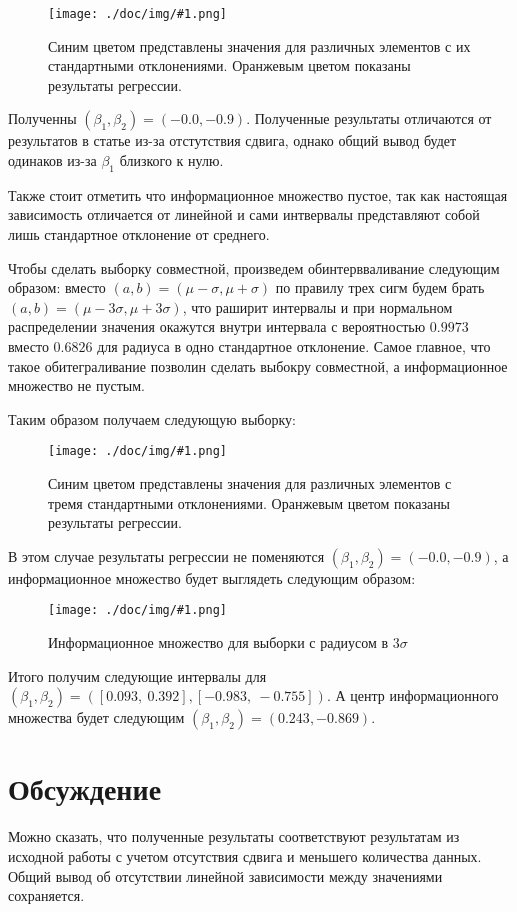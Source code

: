 \documentclass[a4paper,12pt]{article}
\newcommand{\plot}[3]{
    \begin{figure}[H]
        \begin{center}
            \texttt{[image: ./doc/img/\#1.png]}
            \caption{#2}
            \label{#3}
        \end{center}
    \end{figure}
}
\begin{document}
    \plot{Se Sr Y Nb Mo}{
        Синим цветом представлены значения для различных элементов с их стандартными отклонениями.
        Оранжевым цветом показаны результаты регрессии.
    }{linreg}

    
    Полученны $(\beta_1, \beta_2) = (-0.0, -0.9)$. Полученные результаты отличаются от результатов в статье из-за 
    отстутствия сдвига, однако общий вывод будет одинаков из-за $\beta_1$ близкого к нулю.

    Также стоит отметить что информационное множество пустое, так как настоящая зависимость отличается от линейной
    и сами интвервалы представляют собой лишь стандартное отклонение от среднего.

    Чтобы сделать выборку совместной, произведем обинтервваливание следующим образом:
    вместо $(a, b) = (\mu - \sigma, \mu + \sigma)$ по правилу трех сигм будем брать 
    $(a, b) = (\mu - 3\sigma, \mu + 3\sigma)$, что раширит интервалы и при нормальном распределении
    значения окажутся внутри интервала с вероятностью $0.9973$ вместо $0.6826$
    для радиуса в одно стандартное отклонение. Самое главное, что такое обитеграливание 
    позволин сделать выбокру совместной, а информационное множество не пустым.

    Таким образом получаем следующую выборку:

    \plot{Se Sr Y Nb Mo 3sig}
    {Синим цветом представлены значения для различных элементов с тремя стандартными отклонениями.
    Оранжевым цветом показаны результаты регрессии.}
    {linreg-3sig}

    В этом случае результаты регрессии не поменяются $(\beta_1, \beta_2) = (-0.0, -0.9)$, 
    а информационное множество будет выглядеть следующим образом:

    \plot{Se Sr Y Nb Mo 3sig infoset}
    {Информационное множество для выборки с радиусом в $3\sigma$}
    {infoset-3sig}

    Итого получим следующие интервалы для $(\beta_1, \beta_2) = ([0.093,\ 0.392], [-0.983,\ -0.755])$.
    А центр информационного множества будет следующим $(\beta_1, \beta_2) = (0.243, -0.869)$. 

    \section{Обсуждение}
    \quad Можно сказать, что полученные результаты соответствуют результатам из исходной работы 
    с учетом отсутствия сдвига и меньшего количества данных. Общий вывод об отсутствии линейной 
    зависимости между значениями сохраняется.
\end{document}
